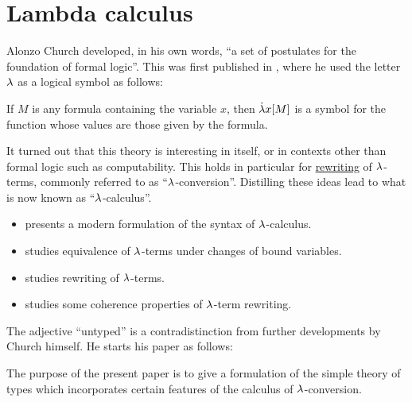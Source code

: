 \chapter{Lambda calculus}\label{ch:lambda_calculus}

Alonzo Church developed, in his own words, \enquote{a set of postulates for the foundation of formal logic}. This was first published in \cite{Church1932LambdaCalculus}, where he used the letter \( {\mathrm \lambda} \) as a logical symbol as follows:
\begin{displayquote}
  If \( M \) is any formula containing the variable \( x \), then \( \dot{{\mathrm \lambda}} x [M] \) is a symbol for the function whose values are those given by the formula.
\end{displayquote}

It turned out that this theory is interesting in itself, or in contexts other than formal logic such as computability. This holds in particular for \hyperref[def:rewriting_system]{rewriting} of \( {\mathrm \lambda} \)-terms, commonly referred to as \enquote{\( {\mathrm \lambda} \)-conversion}. Distilling these ideas lead to what is now known as \enquote{\( {\mathrm \lambda} \)-calculus}.

\begin{itemize}
  \item {} presents a modern formulation of the syntax of \( {\mathrm \lambda} \)-calculus.
  \item {} studies equivalence of \( {\mathrm \lambda} \)-terms under changes of bound variables.
  \item {} studies rewriting of \( {\mathrm \lambda} \)-terms.
  \item {} studies some coherence properties of \( {\mathrm \lambda} \)-term rewriting.
\end{itemize}

The adjective \enquote{untyped} is a contradistinction from further developments by Church himself. He starts his paper \cite{Church1940STT} as follows:
\begin{displayquote}
  The purpose of the present paper is to give a formulation of the simple theory of types which incorporates certain features of the calculus of \( {\mathrm \lambda} \)-conversion.
\end{displayquote}

